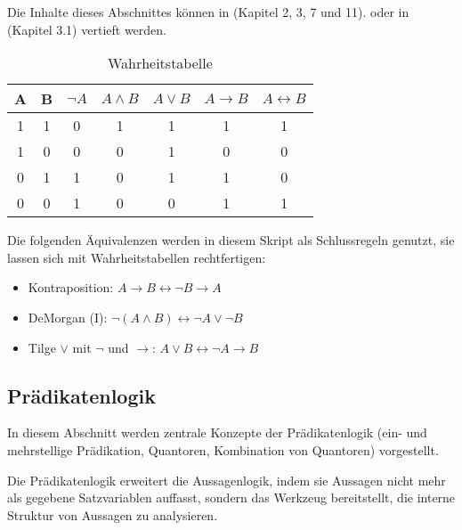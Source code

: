 Die Inhalte dieses Abschnittes können in \cite{link} (Kapitel 2, 3, 7 und 11).
oder in \cite{hoffmann} (Kapitel 3.1)
vertieft werden.

\begin{table}[ht]
    \caption{Wahrheitstabelle}
    \centering
    \begin{tabular}{|c|c|c|c|c|c|c|}
    \hline
          A
        & B
        & $\neg A$
        & $A \wedge B$
        & $A \vee B$
        & $A \rightarrow B$
        & $A \leftrightarrow B$
        \\
        \hline
          1
        & 1
        & 0
        & 1
        & 1
        & 1
        & 1
        \\
        \hline
          1
        & 0
        & 0
        & 0
        & 1
        & 0
        & 0
        \\
        \hline
          0
        & 1
        & 1
        & 0
        & 1
        & 1
        & 0
        \\
        \hline
          0
        & 0
        & 1
        & 0
        & 0
        & 1
        & 1
        \\

    \hline
    \end{tabular}
    \label{tab:al}
\end{table}

Die folgenden Äquivalenzen werden in diesem Skript als Schlussregeln genutzt,
sie lassen sich mit Wahrheitstabellen rechtfertigen:
\begin{itemize}
    \item Kontraposition:
        $A \rightarrow B \leftrightarrow \neg B \rightarrow A$
    \item DeMorgan (I):
        $\neg (A \wedge B) \leftrightarrow \neg A \vee \neg B$

    \item Tilge $\vee$ mit $\neg$ und $\rightarrow$:
        $A \vee B \leftrightarrow \neg A \rightarrow B$
\end{itemize}


\subsection{Prädikatenlogik}\label{pl}

In diesem Abschnitt werden zentrale Konzepte der Prädikatenlogik
(ein- und mehrstellige Prädikation, Quantoren, Kombination von Quantoren)
vorgestellt.

Die Prädikatenlogik erweitert die Aussagenlogik,
indem sie Aussagen nicht mehr als gegebene Satzvariablen auffasst,
sondern das Werkzeug bereitstellt,
die interne Struktur von Aussagen zu analysieren.

